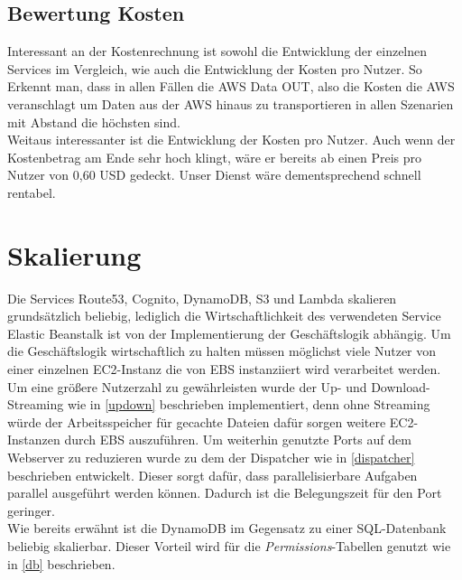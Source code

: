 \documentclass[a4paper, 12pt]{scrreprt}
\renewcommand\_{\textunderscore\allowbreak}
\begin{document}
\subsection{Bewertung Kosten}
Interessant an der Kostenrechnung ist sowohl die Entwicklung der einzelnen Services im Vergleich, wie auch die Entwicklung der Kosten pro Nutzer. So Erkennt man, dass in allen Fällen die AWS Data OUT, also die Kosten die AWS veranschlagt um Daten aus der AWS hinaus zu transportieren in allen Szenarien mit Abstand die höchsten sind. \\
Weitaus interessanter ist die Entwicklung der Kosten pro Nutzer. Auch wenn der Kostenbetrag am Ende sehr hoch klingt, wäre er bereits ab einen Preis pro Nutzer von 0,60 USD gedeckt. Unser Dienst wäre dementsprechend schnell rentabel.




\section{Skalierung}
Die Services Route53, Cognito, DynamoDB, S3 und Lambda skalieren grundsätzlich beliebig, lediglich die Wirtschaftlichkeit des verwendeten Service Elastic Beanstalk ist von der Implementierung der Geschäftslogik abhängig. Um die Geschäftslogik wirtschaftlich zu halten müssen möglichst viele Nutzer von einer einzelnen EC2-Instanz die von EBS instanziiert wird verarbeitet werden. Um eine größere Nutzerzahl zu gewährleisten wurde der Up- und Download-Streaming wie in \ref{updown} beschrieben implementiert, denn ohne Streaming würde der Arbeitsspeicher für gecachte Dateien dafür sorgen weitere EC2-Instanzen durch EBS auszuführen.
Um weiterhin genutzte Ports auf dem Webserver zu reduzieren wurde zu dem der Dispatcher wie in \ref{dispatcher} beschrieben entwickelt. Dieser sorgt dafür, dass parallelisierbare Aufgaben parallel ausgeführt werden können. Dadurch ist die Belegungszeit für den Port geringer.\\
Wie bereits erwähnt ist die DynamoDB im Gegensatz zu einer SQL-Datenbank beliebig skalierbar. Dieser Vorteil wird für die \textit{Permissions}-Tabellen genutzt wie in \ref{db} beschrieben.
\end{document}
